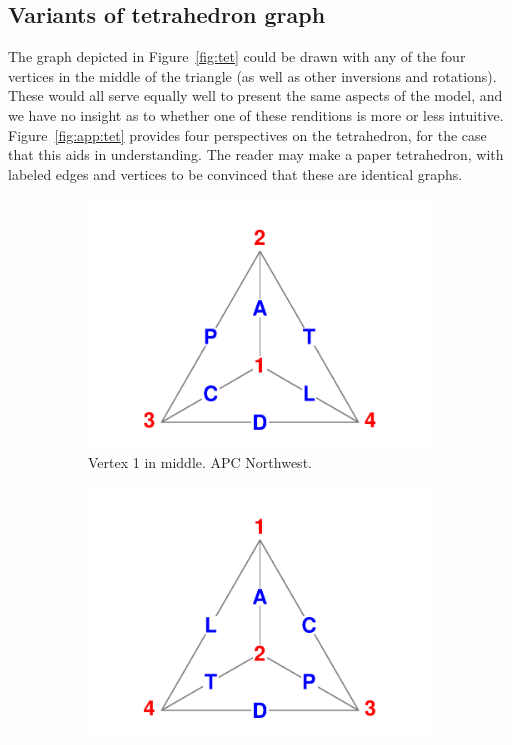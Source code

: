 \documentclass[11pt,oneside,a4paper]{article} %
\newcommand\vt[1]{\textcolor{rd}{#1}}
\begin{document}
\begin{appendices}
\section{Variants of tetrahedron graph}
The graph depicted in Figure~\ref{fig:tet} could be drawn with any of the
four vertices in the middle of the triangle (as well as other inversions
and rotations).
These would all serve equally well to present the same aspects of the model, and
we have no insight as to whether one of these renditions is more or less
intuitive. Figure~\ref{fig:app:tet} provides four perspectives on the
tetrahedron, for the case that this aids in understanding. The reader may make a
paper tetrahedron, with labeled edges and vertices to be convinced that
these are identical graphs.
\begin{figure}
        \centering
        \caption{Some variants of the graph of the APCTDL tetrahedron.} 
         \label{fig:app:tet}
        \begin{subfigure}[b]{0.475\textwidth}
            \centering
            \includegraphics[width=\textwidth]{Figures/Tetra1.pdf}
           \caption{\small Vertex \vt{1} in middle. APC Northwest.}
            \label{fig:tet1}
        \end{subfigure}
        \hfill
        \begin{subfigure}[b]{0.475\textwidth}  
            \centering 
            \includegraphics[width=\textwidth]{Figures/Tetra2.pdf}

\end{subfigure}
\end{figure}
\end{appendices}
\end{document}
